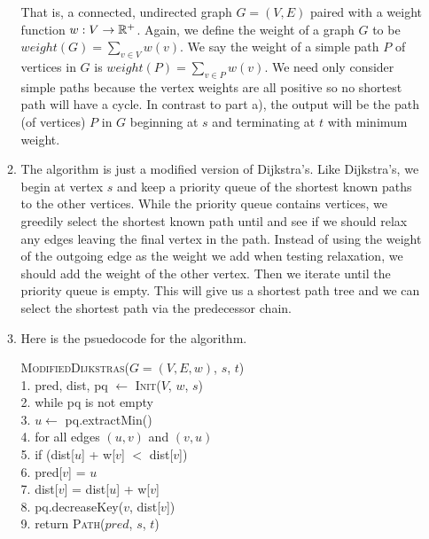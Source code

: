 \documentclass{article}
\begin{document}
\begin{enumerate}[label=(\alph*)]
\begin{enumerate}[label=\alph*)]
            That is, a connected, undirected graph $G = (V, E)$ paired with a weight function $w: V \rightarrow {\mathbb R} ^+$.
            Again, we define the weight of a graph $G$ to be $weight(G) = \sum _{v \in V} w(v)$.
            We say the weight of a simple path $P$ of vertices in $G$ is $weight(P) = \sum _{v \in P} w(v)$.
            We need only consider simple paths because the vertex weights are all positive so no shortest path will have a cycle. \parspace
            In contrast to part a), the output will be the path (of vertices) $P$ in $G$ beginning at $s$ and terminating at $t$ with minimum weight.
            \item The algorithm is just a modified version of Dijkstra's.
            Like Dijkstra's, we begin at vertex $s$ and keep a priority queue of the shortest known paths to the other vertices.
            While the priority queue contains vertices, we greedily select the shortest known path until and see if we should relax any edges leaving the final vertex in the path.
            Instead of using the weight of the outgoing edge as the weight we add when testing relaxation, we should add the weight of the other vertex.
            Then we iterate until the priority queue is empty.
            This will give us a shortest path tree and we can select the shortest path via the predecessor chain.
            \newpage
            \item Here is the psuedocode for the algorithm.
            \begin{algorithm}
                \textsc{ModifiedDijkstras($G=(V,E,w)$, $s$, $t$)} \\
                1. \hspace{1em} pred, dist, pq $\gets $ \textsc{Init}($V$, $w$, $s$) \\
                2. \hspace{1em} while pq is not empty \\
                3. \hspace{2em}     $u \gets $ pq.extractMin() \\
                4. \hspace{2em}     for all edges $(u, v)$ and $(v, u)$ \\
                5. \hspace{3em}         if (dist[$u$] + w[$v$] $<$ dist[$v$]) \\
                6. \hspace{4em}             pred[$v$] = $u$ \\
                7. \hspace{4em}             dist[$v$] = dist[$u$] + w[$v$] \\
                8. \hspace{4em}             pq.decreaseKey($v$, dist[$v$]) \\
                9. \hspace{1em} return \textsc{Path}($pred$, $s$, $t$) \\\\


\end{algorithm}
\end{enumerate}
\end{enumerate}
\end{document}
